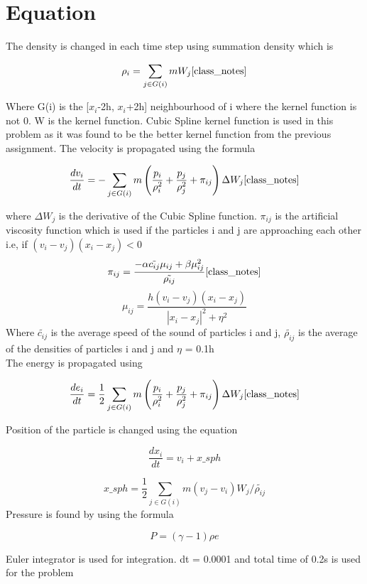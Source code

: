 \documentclass[12pt, a4paper]{report}
\begin{document}
\section*{Equation} 
The density is changed in each time step using summation density which is
\begin{center}
\begin{equation}
	\rho_i = \sum_{j\in G(i)}mW_j \cite{class_notes}
\end{equation}
\end{center}
Where G(i) is the [$x_i$-2h, $x_i$+2h] neighbourhood of i where the kernel function is not 0. W is the kernel function. Cubic Spline kernel function is used in this problem as it was found to be the better kernel function from the previous assignment. 
The velocity is propagated using the formula
\begin{center}
\begin{equation}
	\frac{dv_i}{dt} = -\sum_{j\in G(i)}m\left( \frac{p_i}{\rho_i^2}+\frac{p_j}{\rho_j^2}+\pi_{ij} \right)\Delta W_j \cite{class_notes}
\end{equation}
\end{center}where $\Delta W_j$ is the derivative of the Cubic Spline function. $\pi_{ij}$ is the artificial viscosity function which is used if the particles i and j are approaching each other i.e, if $(v_i-v_j)(x_i-x_j)<0$\\
$$\pi_{ij} = \frac{-\alpha \tilde{c_{ij}}\mu_{ij}+\beta\mu_{ij}^2}{\tilde{\rho_{ij}}}\cite{class_notes}$$
$$\mu_{ij} = \frac{h(v_i-v_j)(x_i-x_j)}{|x_i-x_j|^2+\eta^2}$$ 
Where $\tilde{c_{ij}}$ is the average speed of the sound of particles i and j, $\tilde{\rho_{ij}}$ is the average of the densities of particles i and j and $\eta$ = 0.1h \cite{monaghan} \\
The energy is propagated using 
\begin{center}
\begin{equation}
	\frac{de_i}{dt} = \frac{1}{2}\sum_{j\in G(i)}m\left( \frac{p_i}{\rho_i^2}+\frac{p_j}{\rho_j^2}+\pi_{ij} \right)\Delta W_j \cite{class_notes}
\end{equation}
\end{center}
Position of the particle is changed using the equation
\begin{center}
\begin{equation}
	\frac{dx_i}{dt} = v_i +  x\_sph
\end{equation}
\end{center}
$$	x\_sph = \frac{1}{2}\sum_{j\in G(i)}m(v_j-v_i)W_j/\tilde{\rho_{ij}} $$
Pressure is found by using the formula
\begin{center}
\begin{equation}
	P = \left(\gamma-1 \right)\rho e
\end{equation}
\end{center}
Euler integrator is used for integration. dt = 0.0001 and total time of 0.2s is used for the problem\\
\end{document}
